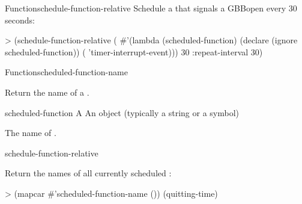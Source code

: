 \documentclass[10pt,twoside,english,pdftex]{article}
\begin{document}
\begin{functiondoc}{Function}{schedule-function-relative}
%
%
Schedule a  that signals a GBBopen
 every 30 seconds:
\begin{example}
> (schedule-function-relative
    (
      #'(lambda (scheduled-function)
          (declare (ignore scheduled-function))
          ( 'timer-interrupt-event)))
    30
    :repeat-interval 30)
\end{example}

\end{functiondoc}


\begin{functiondoc}{Function}{scheduled-function-name}%
  {}
%
%

\fnsyntax

\fnpurpose Return the name of a .

\fnsetf
{}%
  {}{}

\fnpackage {}

\fnmodule {}

\fnargs
\begin{args}{scheduled-function}
 A 
\arg[name] An object (typically a string or a symbol)
\end{args}

\fnreturns The name of . 

\begin{alsos}{schedule-function-relative}
\end{alsos}

%
\fnexample
Return the names of all currently scheduled :
\begin{example}
> (mapcar #'scheduled-function-name ())
(quitting-time)
\end{example}

\end{functiondoc}
\end{document}
